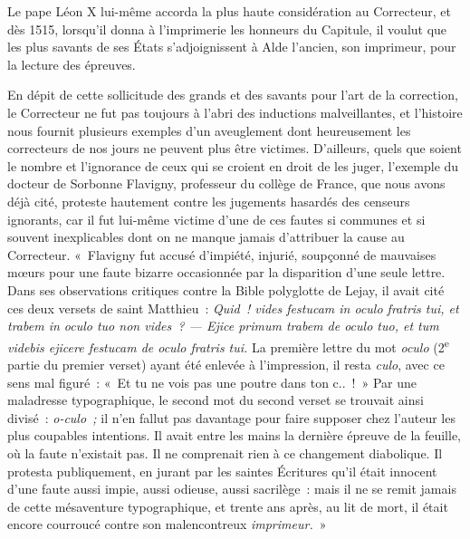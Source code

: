 \documentclass[french,twoside]{book} %
\begin{document}
Le pape Léon X lui-même accorda la plus haute considération au Correcteur, et dès 1515, lorsqu’il donna à l’imprimerie les honneurs du Capitule, il voulut que les plus savants de ses États s’adjoignissent à Alde l’ancien, son imprimeur, pour la lecture des épreuves.\par
En dépit de cette sollicitude des grands et des savants pour l’art de la correction, le Correcteur ne fut pas toujours à l’abri des inductions malveillantes, et l’histoire nous fournit plusieurs exemples d’un aveuglement dont heureusement les correcteurs de nos  jours ne peuvent plus être victimes. D’ailleurs, quels que soient le nombre et l’ignorance de ceux qui se croient en droit de les juger, l’exemple du docteur de Sorbonne Flavigny, professeur du collège de France, que nous avons déjà cité, proteste hautement contre les jugements hasardés des censeurs ignorants, car il fut lui-même victime d’une de ces fautes si communes et si souvent inexplicables dont on ne manque jamais d’attribuer la cause au Correcteur. « Flavigny fut accusé d’impiété, injurié, soupçonné de mauvaises mœurs pour une faute bizarre occasionnée par la disparition d’une seule lettre. Dans ses observations critiques contre la Bible polyglotte de Lejay, il avait cité ces deux versets de saint Matthieu : \emph{Quid ! vides festucam in oculo fratris tui, et trabem in oculo tuo non vides ? — Ejice primum trabem de oculo tuo, et tum videbis ejicere festucam de oculo fratris tui.}  La première lettre du mot \emph{oculo} (2\textsuperscript{e} partie du premier verset) ayant été enlevée à l’impression, il resta \emph{culo}, avec ce sens mal figuré : « Et tu ne vois pas une poutre dans ton c.. ! » Par une maladresse typographique, le second mot du second verset se trouvait ainsi divisé : \emph{o-culo ;} il n’en fallut pas davantage pour faire supposer chez l’auteur les plus coupables intentions. Il avait entre les mains la dernière épreuve de la feuille, où la faute n’existait pas. Il ne comprenait rien à ce changement diabolique. Il protesta publiquement, en jurant par les saintes Écritures qu’il était innocent d’une faute aussi impie, aussi odieuse, aussi sacrilège : mais il ne se remit jamais de cette mésaventure typographique, et trente ans après, au lit de mort, il était encore courroucé contre son malencontreux \emph{imprimeur.} »\par
\end{document}
